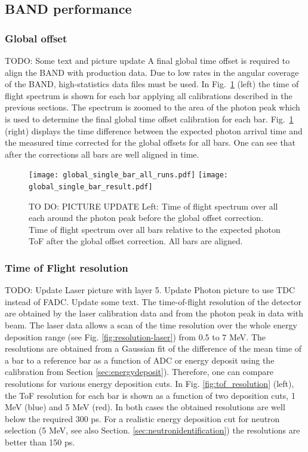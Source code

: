 \documentclass[3p,final,twocolumn]{elsarticle}
\begin{document}
\subsection{BAND performance} 
\subsubsection{Global offset}
\label{sec:global_offset}
{\color{red} TODO: Some text and picture update}
A final global time offset is required to align the BAND with production data. Due to low rates in the angular coverage of the BAND, 
high-statistics data files must be used. 
In Fig.~\ref{fig:final_offset} (left) the time of flight spectrum is shown for each bar applying all calibrations described in the previous sections. The spectrum is zoomed to the area of the photon peak which is used to determine the final global time offset calibration for each bar. Fig.~\ref{fig:final_offset} (right) displays the time difference between the expected photon arrival time and the measured time corrected for the global offsets for all bars. One can see that after the corrections all bars are well aligned in time.
\begin{figure}[tb]
	\centering
		\texttt{[image: global\_single\_bar\_all\_runs.pdf]}
		\texttt{[image: global\_single\_bar\_result.pdf]}
	\caption{TO DO: PICTURE UPDATE Left: Time of flight spectrum over all each around the photon peak before the global offset correction. Time of flight spectrum over all bars relative to the expected photon ToF after  the global offset correction. All bars are aligned.}
	\label{fig:final_offset}
\end{figure}

\subsubsection{Time of Flight resolution}
\label{sec:tofresolution}

{\color{red} TODO: Update Laser picture with layer 5. Update Photon picture to use TDC instead of FADC. Update some text.}
The time-of-flight resolution of the detector are obtained by the laser calibration data and from the photon peak in data with beam. The laser data allows a scan of the time resolution over the whole energy deposition range (see Fig. \ref{fig:resolution-laser}) from 0.5 to 7 \si{\mega\electronvolt}. The resolutions are obtained from a Gaussian fit of the difference of the mean time of a bar to a reference bar as a function of ADC or energy deposit using the calibration from Section \ref{sec:energydeposit}). Therefore, one can compare resolutions for various energy deposition cuts. In Fig. \ref{fig:tof_resolution} (left), the ToF resolution for each bar is shown as a function of two deposition cuts, 1 \si{\mega\electronvolt} (blue) and 5 \si{\mega\electronvolt} (red). In 
both cases the obtained resolutions are well below the required 300 \si{\pico\s}. For a realistic energy deposition cut for neutron selection (5 \si{\mega\electronvolt}, see also Section. \ref{sec:neutronidentification}) the resolutions are better than 150 \si{\pico\s}.
\end{document}
